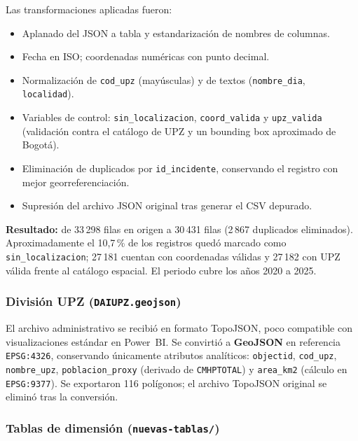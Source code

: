 \documentclass[12pt,letterpaper]{article}
\begin{document}
Las transformaciones aplicadas fueron:
\begin{itemize}[noitemsep, topsep=0pt]
    \item Aplanado del JSON a tabla y estandarización de nombres de columnas.
    \item Fecha en ISO; coordenadas numéricas con punto decimal.
    \item Normalización de \texttt{cod\_upz} (mayúsculas) y de textos (\texttt{nombre\_dia}, \texttt{localidad}).
    \item Variables de control: \texttt{sin\_localizacion}, \texttt{coord\_valida} y \texttt{upz\_valida} (validación contra el catálogo de UPZ y un bounding box aproximado de Bogotá).
    \item Eliminación de duplicados por \texttt{id\_incidente}, conservando el registro con mejor georreferenciación.
    \item Supresión del archivo JSON original tras generar el CSV depurado.
\end{itemize}

\textbf{Resultado:} de 33\,298 filas en origen a 30\,431 filas (2\,867 duplicados eliminados). Aproximadamente el 10,7\,\% de los registros quedó marcado como \texttt{sin\_localizacion}; 27\,181 cuentan con coordenadas válidas y 27\,182 con UPZ válida frente al catálogo espacial. El periodo cubre los años 2020 a 2025.

\subsubsection{División UPZ (\texttt{DAIUPZ.geojson})}

El archivo administrativo se recibió en formato TopoJSON, poco compatible con visualizaciones estándar en Power~BI. Se convirtió a \textbf{GeoJSON} en referencia \texttt{EPSG:4326}, conservando únicamente atributos analíticos: \texttt{objectid}, \texttt{cod\_upz}, \texttt{nombre\_upz}, \texttt{poblacion\_proxy} (derivado de \texttt{CMHPTOTAL}) y \texttt{area\_km2} (cálculo en \texttt{EPSG:9377}). Se exportaron 116 polígonos; el archivo TopoJSON original se eliminó tras la conversión.

\subsubsection{Tablas de dimensión (\texttt{nuevas-tablas/})}
\end{document}

